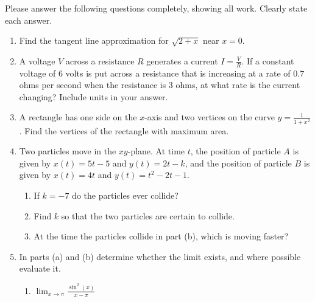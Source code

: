 \documentclass[11pt]{article}
\begin{document}
\drawtitle

\noindent Please answer the following questions completely, showing
all work.  Clearly state each answer.

\begin{enumerate}
\item Find the tangent line approximation for $\sqrt{2 + x}$ near
  $x=0$.

  \vfill

\item A voltage $V$ across a resistance $R$ generates a current
  $I=\frac{V}{R}$.  If a constant voltage of 6 volts is put across a
  resistance that is increasing at a rate of $0.7$ ohms per second
  when the resistance is 3 ohms, at what rate is the current
  changing?  Include units in your answer.

  \vfill
  \newpage
  
\item A rectangle has one side on the $x$-axis and two vertices on the
  curve $y=\frac{1}{1 + x^2}$. Find the vertices of the rectangle with
  maximum area.

  \newpage

\item Two particles move in the $xy$-plane.  At time $t$, the position
  of particle $A$ is given by $x(t) = 5t - 5$ and $y(t) = 2t - k$, and
  the position of particle $B$ is given by $x(t) = 4t$ and $y(t) = t^2
  - 2t - 1$.
  \begin{enumerate}
  \item If $k=-7$ do the particles ever collide?
    

    \vfill
    
  \item Find $k$ so that the two particles are certain to collide.

    \vfill
    
  \item At the time the particles collide in part (b), which is moving
    faster?

    \vfill
  \end{enumerate}
  \newpage

\item In parts (a) and (b) determine whether the limit exists, and
  where possible evaluate it.
  \begin{enumerate}
  \item $\displaystyle\lim_{x\to \pi}\frac{\sin^2(x)}{x-\pi}$

    \vfill
    

\end{enumerate}
\end{enumerate}
\end{document}
